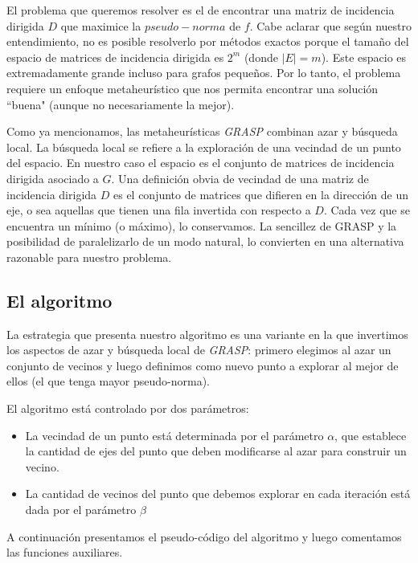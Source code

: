 \documentclass[10pt, a4paper, twocolumn]{article} %
\begin{document}
El problema que queremos resolver es el de encontrar una matriz de 
incidencia dirigida $D$ que maximice la $pseudo-norma$ de $f$. 
Cabe aclarar que según nuestro entendimiento, no es posible resolverlo 
por métodos exactos porque el tamaño del espacio de matrices de 
incidencia dirigida es $2^m$  (donde $|E|=m$). Este espacio es 
extremadamente grande incluso para grafos pequeños. Por lo tanto, el 
problema requiere un enfoque metaheurístico que nos permita encontrar 
una solución ``buena" (aunque no necesariamente la mejor).

\smallskip

Como ya mencionamos, las metaheurísticas \textit{GRASP} combinan azar y 
búsqueda local. La búsqueda local se refiere a la exploración de 
una vecindad de un punto del espacio. En nuestro caso el espacio es el 
conjunto de matrices de incidencia dirigida asociado a $G$. Una 
definición obvia de vecindad de una matriz de incidencia dirigida $D$ es 
el conjunto de matrices que difieren en la dirección de un eje, o sea 
aquellas que tienen una fila invertida con respecto a $D$. Cada vez que 
se encuentra un mínimo (o máximo), lo conservamos. La sencillez de 
GRASP y la posibilidad de paralelizarlo de un modo natural, lo 
convierten en una alternativa razonable para nuestro problema.

\subsection{El algoritmo}

La estrategia que presenta nuestro algoritmo es una variante en la que 
invertimos los aspectos de azar y búsqueda local de \textit{GRASP}: 
primero elegimos al azar un conjunto de vecinos y luego definimos como 
nuevo punto a explorar al mejor de ellos (el que tenga mayor 
pseudo-norma). 

\smallskip

El algoritmo está controlado por dos parámetros:

\begin{itemize}
	\item La vecindad de un punto está determinada por el parámetro 
	$\alpha$, que establece la cantidad de ejes del punto que deben 
	modificarse al azar para construir un vecino.
	\item La cantidad de vecinos del punto que debemos explorar en cada 
	iteración está dada por el parámetro $\beta$
\end{itemize}

A continuación presentamos el pseudo-código del algoritmo y luego 
comentamos las funciones auxiliares.
\end{document}
